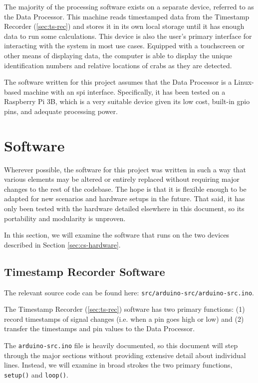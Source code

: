 \documentclass[12pt]{article}
\begin{document}
The majority of the processing software exists on a separate device, referred
to as the Data Processor.
This machine reads timestamped data from the
Timestamp Recorder (\ref{sec:ts-rec}) and stores it in its own local storage
until it has enough data to run some calculations.
This device is also the user's primary interface for interacting with the
system in most use cases.
Equipped with a touchscreen or other means of displaying data, the computer is
able to display the unique identification numbers and relative locations of
crabs as they are detected.

The software written for this project assumes that the Data Processor is a
Linux-based machine with an \gls{spi} interface.
Specifically, it has been tested on a Raspberry Pi 3B, which is a very
suitable device given its low cost, built-in \gls{gpio} pins, and adequate
processing power.

\section{Software}\label{sec:software}

Wherever possible, the software for this project was written in such a way that
various elements may be altered or entirely replaced without requiring major
changes to the rest of the codebase.
The hope is that it is flexible enough to be adapted for new scenarios and
hardware setups in the future.
That said, it has only been tested with the hardware detailed elsewhere in this
document, so its portability and modularity is unproven.

In this section, we will examine the software that runs on the two devices
described in Section \ref{sec:cs-hardware}.

\subsection{Timestamp Recorder Software}\label{sec:ts-rec-sw}

The relevant source code can be found here:
\texttt{src/arduino-src/arduino-src.ino}.

The Timestamp Recorder (\ref{sec:ts-rec}) software has two primary functions:
(1) record timestamps of signal changes (i.e. when a pin goes high or low) and
(2) transfer the timestamps and pin values to the Data Processor.

The \texttt{arduino-src.ino} file is heavily documented, so this document
will step through the major sections without providing extensive detail about
individual lines.
Instead, we will examine in broad strokes the two primary functions,
\texttt{setup()} and \texttt{loop()}.
\end{document}
